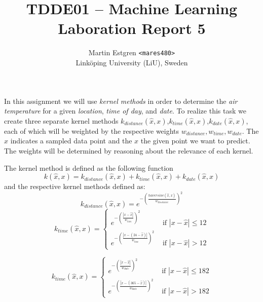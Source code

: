 \documentclass[a4paper, 12pt]{article}
\title{TDDE01 -- Machine Learning \\
Laboration Report 5}
\author{{Martin Estgren \texttt{<mares480>}} \\
{Linköping University (LiU), Sweden}}
\begin{document}
    \maketitle %

    In this assignment we will use \textit{kernel methods} in order to determine the \textit{air temperature} for a given \textit{location}, \textit{time of day}, and \textit{date}. To realize this task we create three separate kernel methods \(k_{distance}(\hat{x}, x)\),\(k_{time}(\hat{x}, x)\),\(k_{date}(\hat{x}, x)\), each of which will be weighted by the respective weights \(w_{distance}, w_{time}, w_{date}\). The \(\hat{x}\) indicates a sampled data point and the \(x\) the given point we want to predict. The weights will be determined by reasoning about the relevance of each kernel.

    The kernel method is defined as the following function
    \begin{equation}
        k(\hat{x}, x) = k_{distance}(\hat{x}, x) + k_{time}(\hat{x}, x) + k_{date}(\hat{x}, x)
    \end{equation}
    and the respective kernel methods defined as:
    \begin{equation}
        k_{distance}(\hat{x}, x) = e^{-(\frac{haversine(\hat{x}, x)}{w_{disstance}})^2}
    \end{equation}
       \begin{equation}
        k_{time}(\hat{x}, x) = 
                \begin{cases}
        e^{-(\frac{\left |x - \hat{x} \right |}{w_{tim}})^2} & \text{ if } \left |x - \hat{x} \right | \le 12 \\ 
        e^{-(\frac{\left |x - (24- \hat{x}) \right |}{w_{tim}})^2} & \text{ if }  \left |x - \hat{x} \right | > 12 
        \end{cases}     
    \end{equation}

    \begin{equation}
        k_{time}(\hat{x}, x) = 
        \begin{cases}
        e^{-(\frac{\left |x - \hat{x}\right |}{w_{date}})^2} & \text{ if } \left |x - \hat{x}\right | \le 182 \\ 
        e^{-(\frac{\left |x - (365- \hat{x})\right |}{w_{date}})^2} & \text{ if }  \left |x - \hat{x}\right | > 182 
        \end{cases}     
    \end{equation}
\end{document}
